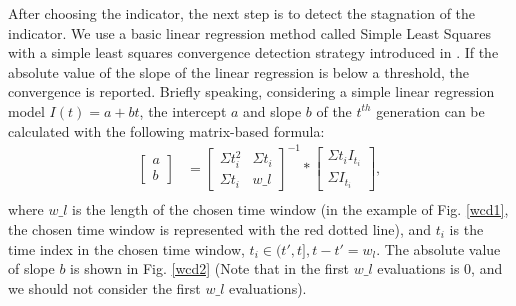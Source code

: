 \documentclass[conference]{IEEEtran}
\begin{document}
After choosing the indicator, the next step is to detect the stagnation of the indicator.
We use a basic linear regression method called Simple Least Squares\cite{SimpleLeastSquares} with a
simple least squares convergence detection strategy introduced in \cite{convergenceDetection:LSSC}.
If the absolute value of the slope of the linear regression is below a threshold, the convergence is reported.
Briefly speaking, considering a simple linear regression model $I(t)=a+bt$, 
the intercept $a$ and slope $b$ of the $t^{th}$ generation can be calculated 
with the following matrix-based formula:
\begin{equation}\begin{aligned}\label{elr1}
  \left[
    \begin{matrix}
      a \\
      b
    \end{matrix}
  \right]
  &= 
  \left[
    \begin{matrix}
      \Sigma t_i^2 & \Sigma t_i \\
      \Sigma t_i   & w\_l 
    \end{matrix}
  \right]^{-1}
  *
  \left[
    \begin{matrix}
      \Sigma t_i I_{t_i} \\
      \Sigma I_{t_i} 
    \end{matrix}
  \right], \\
\end{aligned}
\end{equation}
where $w\_ l$ is the length of the chosen time window
(in the example of Fig. \ref{wcd1}, the chosen time window is represented with the red dotted line), 
and $t_i$ is the time index in the chosen time window, $t_i \in (t',t], t - t' = w_l$.
The absolute value of slope $b$ is shown in Fig. \ref{wcd2} 
(Note that in the first $w\_ l$ evaluations is 0, 
and we should not consider the first $w\_ l$ evaluations). 
\end{document}
